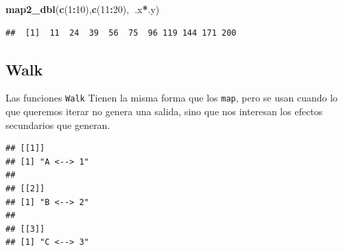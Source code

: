 \documentclass[]{book}
\newenvironment{Shaded}{\begin{snugshade}}{\end{snugshade}}
\newcommand{\ControlFlowTok}[1]{\textcolor[rgb]{0.13,0.29,0.53}{\textbf{#1}}}
\newcommand{\DecValTok}[1]{\textcolor[rgb]{0.00,0.00,0.81}{#1}}
\newcommand{\KeywordTok}[1]{\textcolor[rgb]{0.13,0.29,0.53}{\textbf{#1}}}
\newcommand{\NormalTok}[1]{#1}
\newcommand{\OperatorTok}[1]{\textcolor[rgb]{0.81,0.36,0.00}{\textbf{#1}}}
\newcommand{\StringTok}[1]{\textcolor[rgb]{0.31,0.60,0.02}{#1}}
\begin{document}
\begin{Shaded}
\begin{Highlighting}[]
\KeywordTok{map2_dbl}\NormalTok{(}\KeywordTok{c}\NormalTok{(}\DecValTok{1}\OperatorTok{:}\DecValTok{10}\NormalTok{),}\KeywordTok{c}\NormalTok{(}\DecValTok{11}\OperatorTok{:}\DecValTok{20}\NormalTok{),}\OperatorTok{~}\NormalTok{.x}\OperatorTok{*}\NormalTok{.y)}
\end{Highlighting}
\end{Shaded}

\begin{verbatim}
##  [1]  11  24  39  56  75  96 119 144 171 200
\end{verbatim}

\hypertarget{walk}{%
\subsection{Walk}\label{walk}}

Las funciones \texttt{Walk} Tienen la misma forma que los \texttt{map}, pero se usan cuando lo que queremos iterar no genera una salida, sino que nos interesan los efectos secundarios que generan.

\begin{Shaded}
\end{Shaded}

\begin{verbatim}
## [[1]]
## [1] "A <--> 1"
## 
## [[2]]
## [1] "B <--> 2"
## 
## [[3]]
## [1] "C <--> 3"
\end{verbatim}

\begin{Shaded}
\end{Shaded}

\begin{Shaded}
\end{Shaded}
\end{document}
